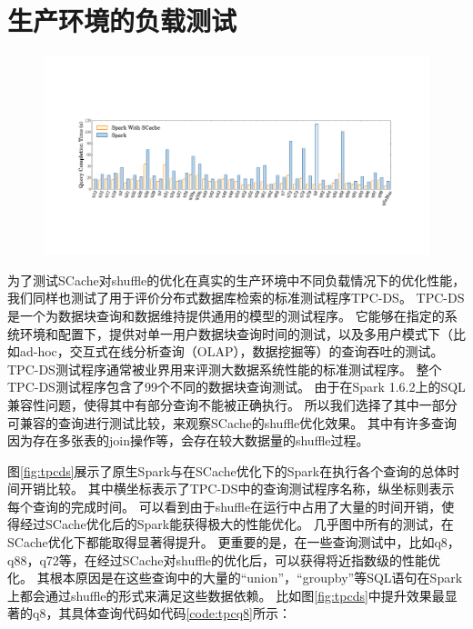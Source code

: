 \section{生产环境的负载测试}

\begin{figure}[!htp]
	\centering
	\includegraphics[width=\textwidth]{../../PPoPP-2018/fig/tpcds.pdf}
\end{figure}

为了测试SCache对shuffle的优化在真实的生产环境中不同负载情况下的优化性能，我们同样也测试了用于评价分布式数据库检索的标准测试程序TPC-DS\cite{tpcds}。
TPC-DS是一个为数据块查询和数据维持提供通用的模型的测试程序。
它能够在指定的系统环境和配置下，提供对单一用户数据块查询时间的测试，以及多用户模式下（比如ad-hoc，交互式在线分析查询（OLAP），数据挖掘等）的查询吞吐的测试。
TPC-DS测试程序通常被业界用来评测大数据系统性能的标准测试程序。
整个TPC-DS测试程序包含了99个不同的数据块查询测试。
由于在Spark 1.6.2上的SQL兼容性问题，使得其中有部分查询不能被正确执行。
所以我们选择了其中一部分可兼容的查询进行测试比较，来观察SCache的shuffle优化效果。
其中有许多查询因为存在多张表的join操作等，会存在较大数据量的shuffle过程。

图\ref{fig:tpcds}展示了原生Spark与在SCache优化下的Spark在执行各个查询的总体时间开销比较。
其中横坐标表示了TPC-DS中的查询测试程序名称，纵坐标则表示每个查询的完成时间。
可以看到由于shuffle在运行中占用了大量的时间开销，使得经过SCache优化后的Spark能获得极大的性能优化。
几乎图中所有的测试，在SCache优化下都能取得显著得提升。
更重要的是，在一些查询测试中，比如q8，q88，q72等，在经过SCache对shuffle的优化后，可以获得将近指数级的性能优化。
其根本原因是在这些查询中的大量的“union”，“groupby”等SQL语句在Spark上都会通过shuffle的形式来满足这些数据依赖。
比如图\ref{fig:tpcds}中提升效果最显著的q8，其具体查询代码如代码\ref{code:tpcq8}所示\cite{sparktpcds}：

